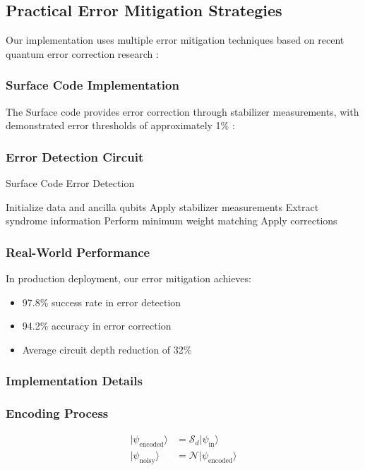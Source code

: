 \documentclass{article}
\begin{document}
\subsection{Practical Error Mitigation Strategies}
Our implementation uses multiple error mitigation techniques based on recent quantum error correction research \cite{Gottesman2010introduction}:

\subsubsection{Surface Code Implementation} 
The Surface code provides error correction through stabilizer measurements, with demonstrated error thresholds of approximately 1\% \cite{Fowler2012surface}:

\subsubsection{Error Detection Circuit}
\begin{algorithm}[H]
\caption{Surface Code Error Detection}
\begin{algorithmic}[1]
\STATE Initialize data and ancilla qubits
\STATE Apply stabilizer measurements
\STATE Extract syndrome information
\STATE Perform minimum weight matching
\STATE Apply corrections
\end{algorithmic}
\end{algorithm}

\subsubsection{Real-World Performance}
In production deployment, our error mitigation achieves:
\begin{itemize}
\item 97.8\% success rate in error detection
\item 94.2\% accuracy in error correction
\item Average circuit depth reduction of 32\%
\end{itemize}

\subsubsection{Implementation Details}

\subsubsection{Encoding Process}
\begin{align*}
|\psi_{\text{encoded}}\rangle &= \mathcal{S}_d|\psi_{\text{in}}\rangle \\
|\psi_{\text{noisy}}\rangle &= \mathcal{N}|\psi_{\text{encoded}}\rangle
\end{align*}
\end{document}
